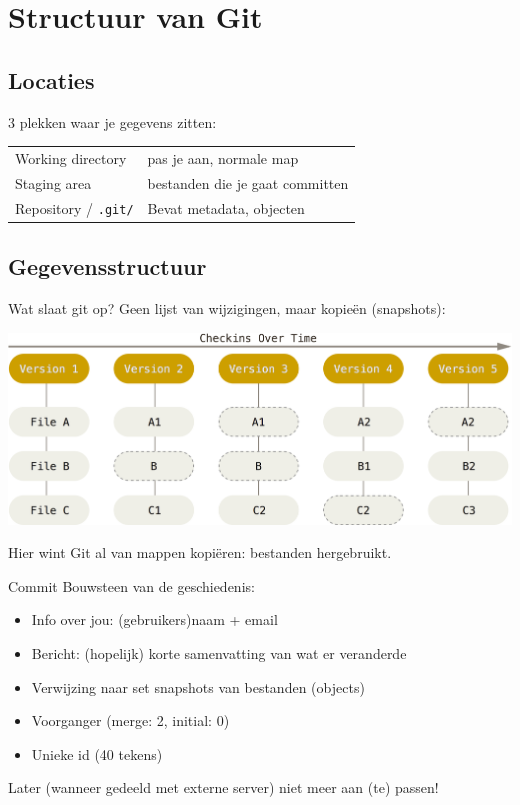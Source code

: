 \section[Structuur]{Structuur van Git}
\subsection{Locaties}
\begin{frame}
	3 plekken waar je gegevens zitten:\\
	\vspace{.5cm}
	\begin{tabular}{ll}
		 Working directory			& pas je aan, normale map\\
		 Staging area				& bestanden die je gaat committen\\
		 Repository / \texttt{.git/}&Bevat metadata, objecten
	\end{tabular}
\end{frame}

\subsection{Gegevensstructuur}
\begin{frame}{Wat slaat git op?}
	Geen lijst van wijzigingen, maar kopie\"en (snapshots):
	\begin{center}
		\includegraphics[width=\textwidth]{images/snapshots.png}
	\end{center}
	{\footnotesize Hier wint Git al van mappen kopi\"eren: bestanden hergebruikt. }
\end{frame}

\begin{frame}{Commit}
	Bouwsteen van de geschiedenis:
	\begin{itemize}
		\item Info over jou: (gebruikers)naam + email
		\item Bericht: (hopelijk) korte samenvatting van wat er veranderde
		\item Verwijzing naar set snapshots van bestanden (objects)
		\item Voorganger (merge: 2, initial: 0)
		\item Unieke id (40 tekens)
	\end{itemize}
	\alert{Later (wanneer gedeeld met externe server) niet meer aan (te) passen!}
\end{frame}
